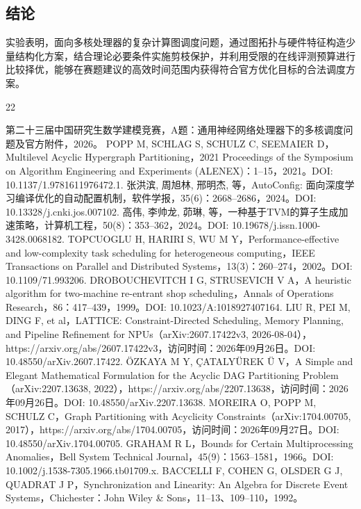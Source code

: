 \documentclass[anonymous,withtoc]{gmcm2026}
\begin{document}
\subsection{结论}

实验表明，面向多核处理器的复杂计算图调度问题，通过图拓扑与硬件特征构造少量结构化方案，结合理论必要条件实施剪枝保护，并利用受限的在线评测预算进行比较择优，能够在赛题建议的高效时间范围内获得符合官方优化目标的合法调度方案。


\FloatBarrier
\clearpage\begin{thebibliography}{22}
\raggedright
{} 第二十三届中国研究生数学建模竞赛，A题：通用神经网络处理器下的多核调度问题及官方附件，2026。
 POPP M, SCHLAG S, SCHULZ C, SEEMAIER D，Multilevel Acyclic Hypergraph Partitioning，2021 Proceedings of the Symposium on Algorithm Engineering and Experiments (ALENEX)：1--15，2021。DOI: 10.1137/1.9781611976472.1.
 张洪滨, 周旭林, 邢明杰, 等，AutoConfig: 面向深度学习编译优化的自动配置机制，软件学报，35(6)：2668--2686，2024。DOI: 10.13328/j.cnki.jos.007102.
 高伟, 李帅龙, 茆琳, 等，一种基于TVM的算子生成加速策略，计算机工程，50(8)：353--362，2024。DOI: 10.19678/j.issn.1000-3428.0068182.
 TOPCUOGLU H, HARIRI S, WU M Y，Performance-effective and low-complexity task scheduling for heterogeneous computing，IEEE Transactions on Parallel and Distributed Systems，13(3)：260--274，2002。DOI: 10.1109/71.993206.
 DROBOUCHEVITCH I G, STRUSEVICH V A，A heuristic algorithm for two-machine re-entrant shop scheduling，Annals of Operations Research，86：417--439，1999。DOI: 10.1023/A:1018927407164.
 LIU R, PEI M, DING F, et al，LATTICE: Constraint-Directed Scheduling, Memory Planning, and Pipeline Refinement for NPUs（arXiv:2607.17422v3, 2026-08-04），https://arxiv.org/abs/2607.17422v3，访问时间：2026年09月26日。DOI: 10.48550/arXiv.2607.17422.
 ÖZKAYA M Y, ÇATALYÜREK Ü V，A Simple and Elegant Mathematical Formulation for the Acyclic DAG Partitioning Problem（arXiv:2207.13638, 2022），https://arxiv.org/abs/2207.13638，访问时间：2026年09月26日。DOI: 10.48550/arXiv.2207.13638.
 MOREIRA O, POPP M, SCHULZ C，Graph Partitioning with Acyclicity Constraints（arXiv:1704.00705, 2017），https://arxiv.org/abs/1704.00705，访问时间：2026年09月27日。DOI: 10.48550/arXiv.1704.00705.
 GRAHAM R L，Bounds for Certain Multiprocessing Anomalies，Bell System Technical Journal，45(9)：1563--1581，1966。DOI: 10.1002/j.1538-7305.1966.tb01709.x.
 BACCELLI F, COHEN G, OLSDER G J, QUADRAT J P，Synchronization and Linearity: An Algebra for Discrete Event Systems，Chichester：John Wiley \& Sons，11--13、109--110，1992。

\end{thebibliography}
\end{document}
